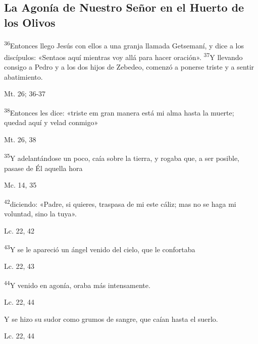 \documentclass[a4paper,11pt]{article}
\begin{document}
    \subsection*{\hfil La Agonía de Nuestro Señor en el Huerto de los Olivos \hfil}
      
      \textsuperscript{36}Entonces llego Jesús con ellos a una granja llamada Getsemaní, y dice a los discípulos: «Sentaos aquí mientras voy allá para hacer oración». 
      \textsuperscript{37}Y llevando consigo a Pedro y a los dos hijos de Zebedeo, comenzó a ponerse triste y a sentir abatimiento.
      \begin{flushright}
        Mt. 26; 36-37     
      \end{flushright}

      \textsuperscript{38}Entonces les dice: «triste em gran manera está mi alma hasta la muerte; quedad aquí y velad conmigo»
      \begin{flushright}
        Mt. 26, 38
      \end{flushright}

      \textsuperscript{35}Y adelantándose un poco, caía sobre la tierra, y rogaba que, a ser posible, pasase de Él aquella hora
      \begin{flushright}
        Mc. 14, 35  
      \end{flushright}

      \textsuperscript{42}diciendo: «Padre, si quieres, traspasa de mi este cáliz; mas no se haga mi voluntad, sino la tuya».
      \begin{flushright}
        Lc. 22, 42
      \end{flushright}

      \textsuperscript{43}Y se le apareció un ángel venido del cielo, que le confortaba
      \begin{flushright}
        Lc. 22, 43
      \end{flushright}

      \textsuperscript{44}Y venido en agonía, oraba más intensamente. 
      \begin{flushright}
        Lc. 22, 44
      \end{flushright}

      Y se hizo su sudor como grumos de sangre, que caían hasta el suerlo.
      \begin{flushright}
        Lc. 22, 44
      \end{flushright}
\end{document}
